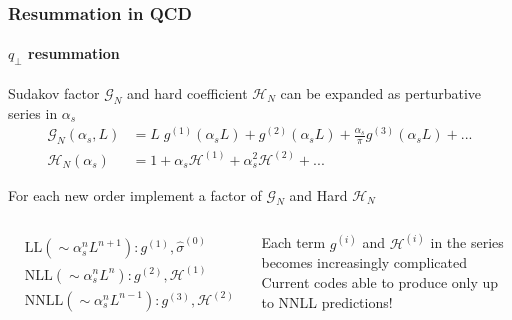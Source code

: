 \documentclass[aspectratio=43]{beamer}
\begin{document}
\begin{frame}
	
	\frametitle{Resummation in QCD}
	\framesubtitle{$q_{\perp}$ resummation}
	
	\footnotesize
	Sudakov factor $\mathcal{G}_{N}$ and hard coefficient $\mathcal{H}_{N}$ can be expanded as perturbative series in $\alpha_{s}$
	\begin{align}
	\mathcal{G}_{N}(\alpha_{s}, L) &= L\;g^{(1)}(\alpha_{s}L) + g^{(2)}(\alpha_{s}L) + \frac{\alpha_{s}}{\pi}g^{(3)}(\alpha_{s}L) + ... \nonumber \\
	\mathcal{H}_{N}(\alpha_{s}) &= 1 + \alpha_{s}\mathcal{H}^{(1)} + \alpha_{s}^{2}\mathcal{H}^{(2)} + ...  \nonumber
	\end{align}
	
	For each new order implement a factor of $\mathcal{G}_{N}$ and Hard $\mathcal{H}_{N}$
	
	\begin{columns}
		
		
		\begin{align}
		&\textrm{LL} (\sim \alpha_{s}^{n}L^{n+1}): g^{(1)}, \hat{\sigma}^{(0)} \nonumber \\
		&\textrm{NLL} (\sim \alpha_{s}^{n}L^{n}): g^{(2)}, \mathcal{H}^{(1)} \nonumber \\
		&\textrm{NNLL} (\sim \alpha_{s}^{n}L^{n-1}): g^{(3)}, \mathcal{H}^{(2)} \nonumber
		\end{align}
		
		
		Each term $g^{(i)}$ and $\mathcal{H}^{(i)}$ in the series becomes increasingly complicated \\
		\vspace{0.25 cm}
		Current codes able to produce only up to NNLL predictions!
		
	\end{columns}

\end{frame}
\end{document}
